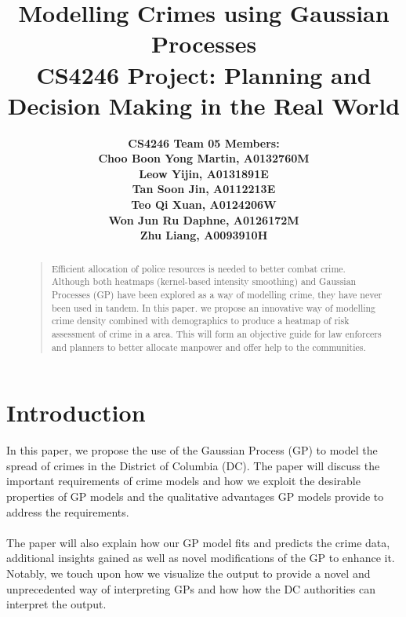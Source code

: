 \documentclass[a4paper, 10pt, conference]{ieeeconf}
\title{\LARGE \bf
	Modelling Crimes using Gaussian Processes\\
	\normalsize CS4246 Project: Planning and Decision Making in the Real World
}
\author{
	\bf \small CS4246 Team 05 Members:\\
	\small Choo Boon Yong Martin, A0132760M\\
	\small Leow Yijin, A0131891E\\
	\small Tan Soon Jin, A0112213E\\
	\small Teo Qi Xuan, A0124206W\\
	\small Won Jun Ru Daphne, A0126172M\\
	\small Zhu Liang, A0093910H\\
}
\begin{document}
		
	
	
	\maketitle
	\thispagestyle{empty}
	\pagestyle{empty}
	
	
	
	\begin{abstract}
	\begin{quote}
		Efficient allocation of police resources is needed to better combat crime. Although both heatmaps (kernel-based intensity smoothing) and Gaussian Processes (GP) have been explored as a way of modelling crime, they have never been used in tandem. 
		In this paper. we propose an innovative way of modelling crime density combined with  demographics to produce a heatmap of risk assessment of crime in a area. This will form an objective guide for law enforcers and planners to better allocate manpower and offer help to the communities.
	\end{quote}
	\end{abstract}
	
	
	\section{Introduction}
	
	In this paper, we propose the use of the Gaussian Process (GP) to model the spread of crimes in the District of Columbia (DC).
	The paper will discuss the important requirements of crime models and how we exploit the desirable properties of GP models and the qualitative advantages GP models provide to address the requirements.\\ \\

	The paper will also explain how our GP model fits and predicts the crime data, additional insights gained as well as novel modifications of the GP to enhance it. 
	Notably, we touch upon how we visualize the output to provide a novel and unprecedented way of interpreting GPs and how how the DC authorities can interpret the output.\\ \\
\end{document}
